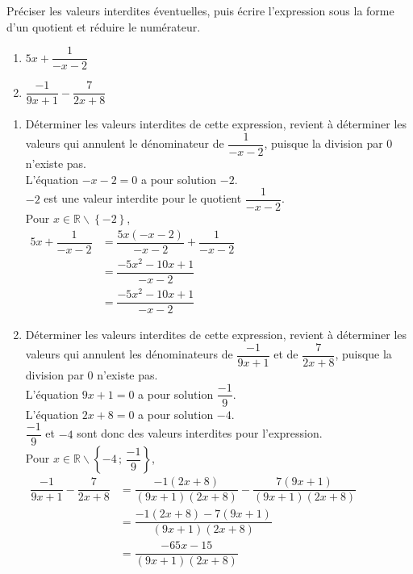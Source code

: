 \documentclass[a4paper,11pt,exos]{nsi} %
\begin{document}
\maketitle

\begin{exercice}%
    Préciser les valeurs interdites éventuelles, puis écrire l'expression sous la forme d'un quotient et réduire le numérateur.
    \begin{multicols}{2}
        \begin{enumerate}
            \item $5x+\dfrac{1}{-x-2}$
            \item $\dfrac{-1}{9x+1}-\dfrac{7}{2x+8}$
        \end{enumerate}
    \end{multicols}
    
\end{exercice}

\begin{enumerate}
    \item Déterminer les valeurs interdites de cette expression, revient à
    déterminer les valeurs qui annulent le dénominateur de $\dfrac{1}{-x-2}$,
    puisque la division par $0$ n'existe pas.\\L'équation $-x-2=0$ a pour solution $-2$. \\
    $-2$ est une valeur interdite pour le quotient $\dfrac{1}{-x-2}$.\\
    Pour $x\in \mathbb{R}\smallsetminus\left\{-2\right\}$, \\
    $\begin{aligned}
    5x+\dfrac{1}{-x-2}&=\dfrac{5x(-x-2)}{-x-2}+\dfrac{1}{-x-2}\\
    &=\dfrac{-5x^2-10x+1}{-x-2}\\
    &=\dfrac{-5x^2-10x+1}{-x-2}
    \end{aligned}$

    \item Déterminer les valeurs interdites de cette expression, revient à déterminer les valeurs qui annulent les dénominateurs de $\dfrac{-1}{9x+1}$ et de $\dfrac{7}{2x+8}$, puisque la division par $0$ n'existe pas.\\
    L'équation $9x+1=0$ a pour solution $\dfrac{-1}{9}$. \\
  L'équation $2x+8=0$ a pour solution $-4$. \\
  $\dfrac{-1}{9}$ et $-4$ sont donc des valeurs interdites pour l'expression. \\
  Pour $x\in \mathbb{R}\smallsetminus\left\{-4\,;\,\dfrac{-1}{9}\right\}$, \\
  $\begin{aligned}
  \dfrac{-1}{9x+1}-\dfrac{7}{2x+8}
  &= \dfrac{-1(2x+8)}{(9x+1)(2x+8)}-\dfrac{7(9x+1)}{(9x+1)(2x+8)}\\
  &=\dfrac{-1(2x+8)-7(9x+1)}{(9x+1)(2x+8)}\\
  &=\dfrac{-65x-15}{(9x+1)(2x+8)}
  \end{aligned}$
\end{enumerate}
\end{document}
